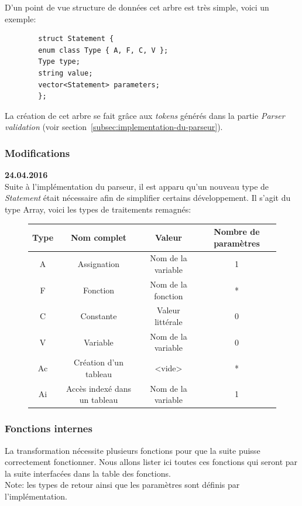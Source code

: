 \documentclass[french]{article}
\begin{document}
		D'un point de vue structure de données cet arbre est très simple, voici un exemple:
		
		\begin{lstlisting}
		struct Statement {
		enum class Type { A, F, C, V };
		Type type;
		string value;
		vector<Statement> parameters;
		};
		\end{lstlisting}
		
		La création de cet arbre se fait grâce aux \textit{tokens} générés dans la partie \textit{Parser validation} (voir section~\ref{subsec:implementation-du-parseur}).
		
		\subsubsection{Modifications}
		\textbf{24.04.2016}\\
		Suite à l'implémentation du parseur, il est apparu qu'un nouveau type de \textit{Statement} était nécessaire afin de simplifier certains développement. Il s'agit du type Array, voici les types de traitements remagnés:
		
		\begin{figure}[H]
			\centering
			\begin{tabular}{cccc}
				Type & Nom complet & Valeur & Nombre de paramètres\\
				\hline
				A & Assignation & Nom de la variable & 1\\
				F & Fonction & Nom de la fonction & *\\
				C & Constante & Valeur littérale & 0\\
				V & Variable & Nom de la variable & 0\\
				Ac & Création d'un tableau & <vide> & *\\
				Ai & Accès indexé dans un tableau & Nom de la variable & 1\\
			\end{tabular}
		\end{figure}
		
		\subsubsection{Fonctions internes}
		La transformation nécessite plusieurs fonctions pour que la suite puisse correctement fonctionner. Nous allons lister ici toutes ces fonctions qui seront par la suite interfacées dans la table des fonctions.\\
		
		Note: les types de retour ainsi que les paramètres sont définis par l'implémentation.
		
\end{document}
